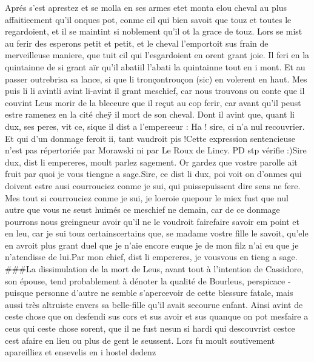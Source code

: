 \documentclass{article}
\begin{document}
\begin{pages}
   Aprés s’est aprestez et se molla en ses armes etet monta 
   elou cheval au plus affaitieement qu’il 
   onques pot, conme cil qui bien savoit que touz et toutes le regardoient, 
   et il se maintint si noblement qu’il ot la grace de touz. Lors se mist au ferir des esperons petit et petit, 
   et le cheval l’emportoit sus frain de merveilleuse maniere, que tuit cil qui l’esgardoient en orent grant joie. 
   Il feri en la quintainne de si grant aïr qu’il abatiil l'abati 
   la quintainne tout en i mont. Et au passer outrebrisa sa lance, 
   si que li tronçontrouçon (sic) en volerent en haut. 
   Mes puis li li avintli avint li-avint
   il grant meschief, car nous trouvons ou conte que 
   il couvint Leus morir de la bleceure que il reçut au cop ferir, car avant qu’il peust estre ramenez en 
   la cité cheÿ il mort de son cheval. Dont il avint que, quant 
   li dux, ses peres, vit ce, sique il dist a
   l’empereeur :
   Ha ! sire, ci n’a nul recouvrier. Et qui d’un donmage feroit ii, 
      tant vaudroit pis !Cette expression sentencieuse n'est pas répertoriée par Morawski ni par 
         Le Roux de Lincy. PD stp vérifie :)Sire dux, dist li empereres, moult parlez sagement.
      Or gardez que vostre parolle ait fruit par quoi je vous tiengne a sage.Sire, ce dist 
      li dux, poi voit on d’onmes qui doivent estre ausi courrouciez conme je sui, qui 
      puissepuissent dire sens ne fere. 
      Mes tout si courrouciez conme je sui, 
      je loeroie quepour le miex 
      fust que nul autre que vous ne seust huimés ce meschief ne demain, car de ce 
      donmage pourrons nous greingneur avoir qu’il ne le voudroit fairefaire savoir 
      em point et en leu, car je sui touz certainscertains que, 
      se madame vostre fille le savoit, 
      qu’ele en avroit plus grant duel que je n’aie encore euque je de mon filz 
         n'ai eu que je n'atendisse de lui.Par mon chief, dist li empereres, je 
      vousvous en tieng a sage.
   ###La dissimulation de la mort de Leus, avant tout à l'intention de Cassidore, son épouse,
   tend probablement à dénoter la qualité de Bourleus, perspicace - puisque personne d'autre ne semble s'apercevoir de cette blessure
   fatale, mais aussi très altruiste envers sa belle-fille qu'il avait secourue enfant. \pend
\pstart Ainsi avint de ceste chose que on desfendi sus cors 
   et sus avoir et sus quanque on pot mesfaire a ceus qui ceste chose sorent, 
   que il ne fust nesun si hardi qui descouvrist 
   cestce cest afaire en lieu 
   ou plus de gent le seussent. Lors fu moult soutivement apareilliez et ensevelis en i hostel dedenz 

\end{pages}
\end{document}
